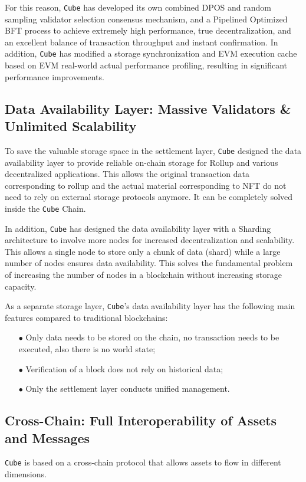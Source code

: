 \documentclass{iacrtrans}
\begin{document}
For this reason, \texttt{Cube} has developed its own combined DPOS and random sampling validator selection consensus mechanism, and a Pipelined Optimized BFT process to achieve extremely high performance, true decentralization, and an excellent balance of transaction throughput and instant confirmation. In addition, \texttt{Cube} has modified a storage synchronization and EVM execution cache based on EVM real-world actual performance profiling, resulting in significant performance improvements.


\subsection{Data Availability Layer: Massive Validators \& Unlimited Scalability}
To save the valuable storage space in the settlement layer, \texttt{Cube} designed the data availability layer to provide reliable on-chain storage for Rollup and various decentralized applications. This allows the original transaction data corresponding to rollup and the actual material corresponding to NFT do not need to rely on external storage protocols anymore. It can be completely solved inside the \texttt{Cube} Chain.

In addition, \texttt{Cube} has designed the data availability layer with a Sharding architecture to involve more nodes for increased decentralization and scalability. This allows a single node to store only a chunk of data (shard) while a large number of nodes ensures data availability. This solves the fundamental problem of increasing the number of nodes in a blockchain without increasing storage capacity.

As a separate storage layer, \texttt{Cube}'s data availability layer has the following main features compared to traditional blockchains:
\begin{itemize}
	\item[$\bullet$] Only data needs to be stored on the chain, no transaction needs to be executed, also there is no world state;
	\item[$\bullet$] Verification of a block does not rely on historical data;
	\item[$\bullet$] Only the settlement layer conducts unified management.
\end{itemize}


\subsection{Cross-Chain: Full Interoperability of Assets and Messages}
\texttt{Cube} is based on a cross-chain protocol that allows assets to flow in different dimensions. 
\end{document}
